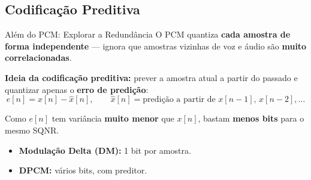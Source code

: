 
\subsection{Codificação Preditiva}

\begin{frame}{Além do PCM: Explorar a Redundância}
  O PCM quantiza \textbf{cada amostra de forma independente} — ignora que
  amostras vizinhas de voz e áudio são \textbf{muito correlacionadas}.

  \vspace{0.3cm}
  \textbf{Ideia da codificação preditiva:} prever a amostra atual a partir
  do passado e quantizar apenas o \textbf{erro de predição}:
  \[
    e[n] = x[n] - \hat{x}[n], \qquad
    \hat{x}[n] = \text{predição a partir de } x[n-1],\, x[n-2],\dots
  \]

  Como $e[n]$ tem variância \textbf{muito menor} que $x[n]$, bastam
  \textbf{menos bits} para o mesmo SQNR.

  \vspace{0.2cm}
  \begin{itemize}
    \item \textbf{Modulação Delta (DM):} 1 bit por amostra.
    \item \textbf{DPCM:} vários bits, com preditor.
  \end{itemize}
\end{frame}


